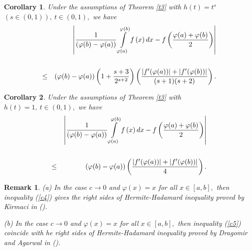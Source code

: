 \documentclass{amsart}
\theoremstyle{plain}
\newtheorem{corollary}{Corollary}
\newtheorem{remark}{Remark}
\numberwithin{equation}{section}
\begin{document}
\begin{corollary}
Under the assumptions of Theorem \ref{t3} with $h(t)=t^{s}$ $(s\in \left(
0,1\right) ),\ t\in \left( 0,1\right) ,$ we have\begin{eqnarray}
&&\left\vert \frac{1}{(\varphi (b)-\varphi (a))}\int\limits_{\varphi
(a)}^{\varphi (b)}f\left( x\right) dx-f\left( \frac{\varphi (a)+\varphi (b)}{2}\right) \right\vert   \notag \\
&&  \label{c5} \\
&\leq &(\varphi (b)-\varphi (a))\left( 1+\frac{s+3}{2^{s+2}}\right) \left( 
\frac{\left\vert f^{\prime }(\varphi (a))\right\vert +\left\vert f^{\prime
}(\varphi (b))\right\vert }{(s+1)(s+2)}\right) .  \notag
\end{eqnarray}
\end{corollary}

\begin{corollary}
Under the assumptions of Theorem \ref{t3} with $h(t)=1,\ t\in \left(
0,1\right) ,$ we have\begin{eqnarray}
&&\left\vert \frac{1}{(\varphi (b)-\varphi (a))}\int\limits_{\varphi
(a)}^{\varphi (b)}f\left( x\right) dx-f\left( \frac{\varphi (a)+\varphi (b)}{2}\right) \right\vert   \label{c6} \\
&&  \notag \\
&\leq &(\varphi (b)-\varphi (a))\left( \frac{\left\vert f^{\prime }(\varphi
(a))\right\vert +\left\vert f^{\prime }(\varphi (b))\right\vert }{4}\right) .
\notag
\end{eqnarray}
\end{corollary}

\begin{remark}
(a) In the case $c\rightarrow 0$ and $\varphi (x)=x$ for all $x\in \left[ a,b\right] ,$ then inequality (\ref{c4}) gives the right sides of
Hermite-Hadamard inequality proved by Kirmaci in (\cite{USK}).

(b) In the case $c\rightarrow 0$ and $\varphi (x)=x$ for all $x\in \left[ a,b\right] ,$ then inequality (\ref{c5}) coincide with he right sides of
Hermite-Hadamard inequality proved by Dragomir and Agarwal in (\cite{dragomir2}).
\end{remark}
\end{document}
